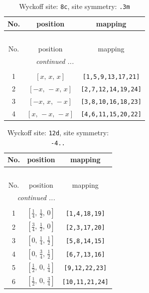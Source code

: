 \documentclass[fleqn,8pt]{jsarticle}
\begin{document}
\renewcommand{\arraystretch}{1.2}
\begin{longtable}{ccc}
\caption{Wyckoff site: {\tt 8c}, site symmetry: {\tt .3m}}
 \\
 \hline \hline
No. & position & mapping \\ \hline \endfirsthead

\multicolumn{2}{l}{\tablename\ \thetable{}} \\
 \hline \hline
No. & position & mapping \\ \hline \endhead

 \hline \hline
\multicolumn{2}{r}{\footnotesize\it continued ...} \\ \endfoot

 \hline \hline
\multicolumn{2}{r}{} \\ \endlastfoot

1 & $\left[ x,\, x,\, x \right]$ & {\tt [1,5,9,13,17,21]} \\ \hline
2 & $\left[ - x,\, - x,\, x \right]$ & {\tt [2,7,12,14,19,24]} \\ \hline
3 & $\left[ - x,\, x,\, - x \right]$ & {\tt [3,8,10,16,18,23]} \\ \hline
4 & $\left[ x,\, - x,\, - x \right]$ & {\tt [4,6,11,15,20,22]} \\
\end{longtable}
\renewcommand{\arraystretch}{1.2}
\begin{longtable}{ccc}
\caption{Wyckoff site: {\tt 12d}, site symmetry: {\tt -4..}}
 \\
 \hline \hline
No. & position & mapping \\ \hline \endfirsthead

\multicolumn{2}{l}{\tablename\ \thetable{}} \\
 \hline \hline
No. & position & mapping \\ \hline \endhead

 \hline \hline
\multicolumn{2}{r}{\footnotesize\it continued ...} \\ \endfoot

 \hline \hline
\multicolumn{2}{r}{} \\ \endlastfoot

1 & $\left[ \frac{1}{4},\, \frac{1}{2},\, 0 \right]$ & {\tt [1,4,18,19]} \\ \hline
2 & $\left[ \frac{3}{4},\, \frac{1}{2},\, 0 \right]$ & {\tt [2,3,17,20]} \\ \hline
3 & $\left[ 0,\, \frac{1}{4},\, \frac{1}{2} \right]$ & {\tt [5,8,14,15]} \\ \hline
4 & $\left[ 0,\, \frac{3}{4},\, \frac{1}{2} \right]$ & {\tt [6,7,13,16]} \\ \hline
5 & $\left[ \frac{1}{2},\, 0,\, \frac{1}{4} \right]$ & {\tt [9,12,22,23]} \\ \hline
6 & $\left[ \frac{1}{2},\, 0,\, \frac{3}{4} \right]$ & {\tt [10,11,21,24]} \\
\end{longtable}
\end{document}
